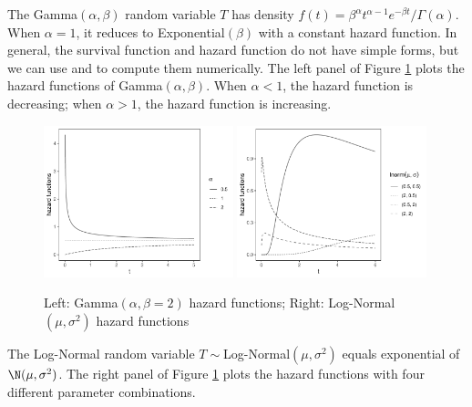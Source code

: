 \begin{example}
[Gamma]
The Gamma$(\alpha, \beta)$ random variable $T$ has density 
$
f(t) =   \beta^\alpha t^{\alpha-1} e^{-\beta t}/ \Gamma(\alpha). 
$
When $\alpha = 1$, it reduces to Exponential$(\beta)$ with a constant hazard function. In general, the survival function and hazard function do not have simple forms, but we can use  and  to compute them numerically. The left panel of Figure \ref{fig::gamma-lnorm-hazard-functions} plots the hazard functions of Gamma$(\alpha, \beta)$. When $\alpha <1$, the hazard function is decreasing; when $\alpha >1$, the hazard function is increasing. 
\end{example}



\begin{figure}
\centering
\includegraphics[width = 0.49\textwidth]{figures/gamma_hazard.pdf}
\includegraphics[width = 0.49\textwidth]{figures/lognormal_hazard.pdf}
\caption{Left: Gamma$(\alpha, \beta = 2)$ hazard functions; Right: Log-Normal$(\mu,\sigma^2)$ hazard functions}\label{fig::gamma-lnorm-hazard-functions}
\end{figure}





\begin{example}
The Log-Normal random variable $T \sim $Log-Normal$(\mu,\sigma^2)$ equals exponential of $\N(\mu,\sigma^2)$. The right panel of Figure \ref{fig::gamma-lnorm-hazard-functions} plots the hazard functions with four different parameter combinations. 
\end{example}



